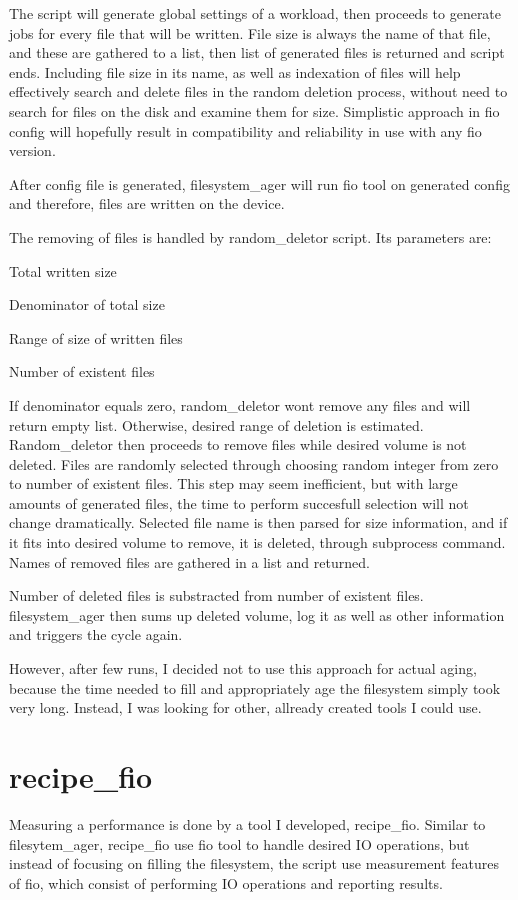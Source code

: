 \documentclass[
  color, %
  table, %
  lof,   %
  lot,   %
]{fithesis3}
\begin{document}
The script will generate global settings of a workload, then proceeds to generate jobs for every file that will be written. File size is always the name of that file, and these are gathered to a list, then list of generated files is returned and script ends. Including file size in its name, as well as indexation of files will help effectively search and delete files in the random deletion process, without need to search for files on the disk and examine them for size. Simplistic approach in fio config will hopefully result in compatibility and reliability in use with any fio version.

After config file is generated, filesystem\_ager will run fio tool on generated config and therefore, files are written on the device.

The removing of files is handled by random\_deletor script. Its parameters are:
\begin{compactenum}
  \item Total written size
  \item Denominator of total size
  \item Range of size of written files
  \item Number of existent files
\end{compactenum}

If denominator equals zero, random\_deletor wont remove any files and will return empty list. Otherwise, desired range of deletion is estimated. Random\_deletor then proceeds to remove files while desired volume is not deleted. Files are randomly selected through choosing random integer from zero to number of existent files. This step may seem inefficient, but with large amounts of generated files, the time to perform succesfull selection will not change dramatically. Selected file name is then parsed for size information, and if it fits into desired volume to remove, it is deleted, through subprocess command. Names of removed files are gathered in a list and returned.

Number of deleted files is substracted from number of existent files.
filesystem\_ager then sums up deleted volume, log it as well as other information and triggers the cycle again.

However, after few runs, I decided not to use this approach for actual aging, because the time needed to fill and appropriately age the filesystem simply took very long. Instead, I was looking for other, allready created tools I could use.


\section{recipe\_fio}
Measuring a performance is done by a tool I developed, recipe\_fio. Similar to filesytem\_ager, recipe\_fio use fio tool to handle desired IO operations, but instead of focusing on filling the filesystem, the script use measurement features of fio, which consist of performing IO operations and reporting results.
\end{document}
